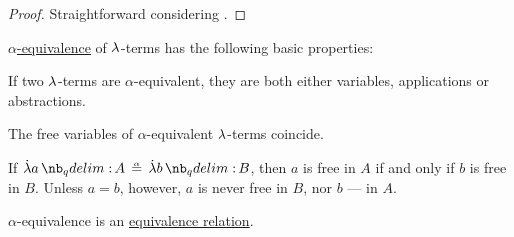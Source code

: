 \begin{proof}
   Straightforward considering .
\end{proof}

\begin{proposition}\label{thm:def:lambda_term_alpha_equivalence}
  \hyperref[def:lambda_term_alpha_equivalence]{\( \alpha \)-equivalence} of \( {\mathrm \lambda} \)-terms has the following basic properties:
  \begin{thmenum}
     If two \( {\mathrm \lambda} \)-terms are \( \alpha \)-equivalent, they are both either variables, applications or abstractions.

     The free variables of \( \alpha \)-equivalent \( {\mathrm \lambda} \)-terms coincide.

     If \( \qabs a A \aequiv \qabs b B \), then \( a \) is free in \( A \) if and only if \( b \) is free in \( B \). Unless \( a = b \), however, \( a \) is never free in \( B \), nor \( b \) --- in \( A \).

     \( \alpha \)-equivalence is an \hyperref[def:equivalence_relation]{equivalence relation}.
  \end{thmenum}
\end{proposition}
